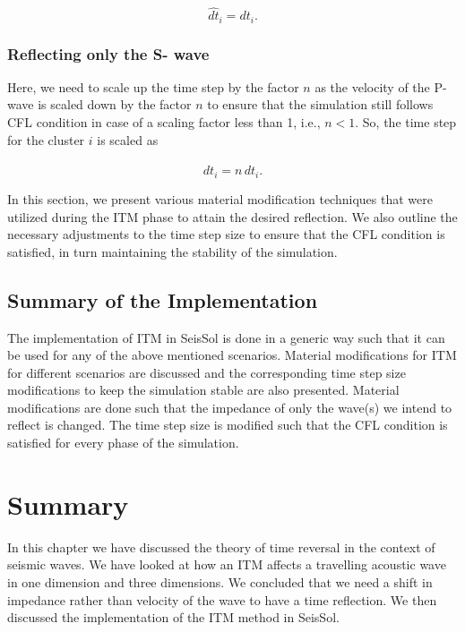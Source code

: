 \begin{equation}
    \hat{dt}_i = dt_i .
\end{equation}

\subsubsection{Reflecting only the S- wave}
Here, we need to scale up the time step by the factor $n$ as the velocity of the P- wave is scaled down by the factor $n$ to ensure that the simulation still follows
\ac{CFL} condition in case of a scaling factor less than 1, i.e., $n < 1$. So, the time step for the cluster $i$ is scaled as

\begin{equation}
    \hat{dt}_i = n \, dt_i .
\end{equation}

In this section, we present various material modification techniques that were utilized during the \ac{ITM} phase to attain the desired reflection. We also outline
the necessary adjustments to the time step size to ensure that the \ac{CFL} condition is satisfied, in turn maintaining the stability of the simulation. \\

\subsection{Summary of the Implementation}
The implementation of \ac{ITM} in SeisSol is done in a generic way such that it can be used for any of the above mentioned scenarios. 
Material modifications for \ac{ITM} for different scenarios are discussed and the corresponding time step size modifications to keep the simulation
stable are also presented. Material modifications are done such that the impedance of only the wave(s) we intend to reflect is changed. 
The time step size is modified such that the \ac{CFL} condition is satisfied for every phase of the simulation. \\


\section{Summary}
In this chapter we have discussed the theory of time reversal in the context of seismic waves. We have looked at how an \ac{ITM} affects a travelling acoustic
wave in one dimension and three dimensions. We concluded that we need a shift in impedance rather than velocity of the wave to have a time reflection. We then discussed
the implementation of the \ac{ITM} method in SeisSol.
